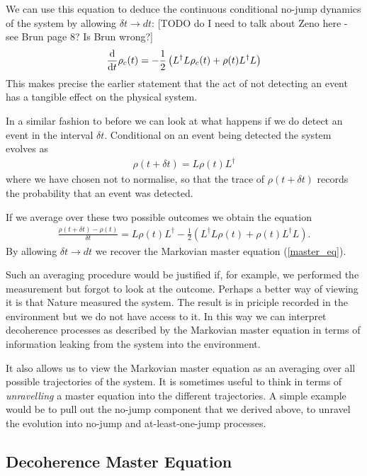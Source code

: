 We can use this equation to deduce the continuous conditional no-jump dynamics of the system by allowing $\delta t \rightarrow dt$: [TODO do I need to talk about Zeno here - see Brun page 8? Is Brun wrong?]
\begin{align}
  \frac{\mathrm{d}}{\mathrm{d}t} \rho_c(t) = - \frac{1}{2} \left(L^\dagger L \rho_c(t) + \rho(t) L^\dagger L \right)
\end{align}
This makes precise the earlier statement that the act of not detecting an event has a tangible effect on the physical system.

In a similar fashion to before we can look at what happens if we do detect an event in the interval $\delta t$. Conditional on an event being detected the system evolves as
\begin{align}
  \rho(t + \delta t) = L\rho(t)L^\dagger
\end{align}
where we have chosen not to normalise, so that the trace of $\rho(t + \delta t)$ records the probability that an event was detected.

If we average over these two possible outcomes we obtain the equation
\begin{align}
\frac{\rho(t + \delta t) - \rho(t)}{\delta t} = L\rho(t)L^\dagger- \frac{1}{2} \left(L^\dagger L \rho(t) + \rho(t) L^\dagger L \right).
\end{align}
By allowing $\delta t \rightarrow dt$ we recover the Markovian master equation (\ref{master_eq}). 

Such an averaging procedure would be justified if, for example, we performed the measurement but forgot to look at the outcome. Perhaps a better way of viewing it is that Nature measured the system. The result is in priciple recorded in the environment but we do not have access to it. In this way we can interpret decoherence processes as described by the Markovian master equation in terms of information leaking from the system into the environment.

It also allows us to view the Markovian master equation as an averaging over all possible trajectories of the system. It is sometimes useful to think in terms of \textit{unravelling} a master equation into the different trajectories. A simple example would be to pull out the no-jump component that we derived above, to unravel the evolution into no-jump and at-least-one-jump processes.


\subsection{Decoherence Master Equation}

